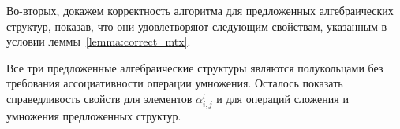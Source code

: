 Во-вторых, докажем корректность алгоритма для предложенных алгебраических структур, показав, что они удовлетворяют следующим свойствам, указанным в условии леммы~\ref{lemma:correct_mtx}.%
	

Все три предложенные алгебраические структуры являются полукольцами без требования ассоциативности операции умножения. Осталось показать справедливость свойств для элементов $\alpha^l_{i, j}$ и для операций сложения и умножения предложенных структур.

